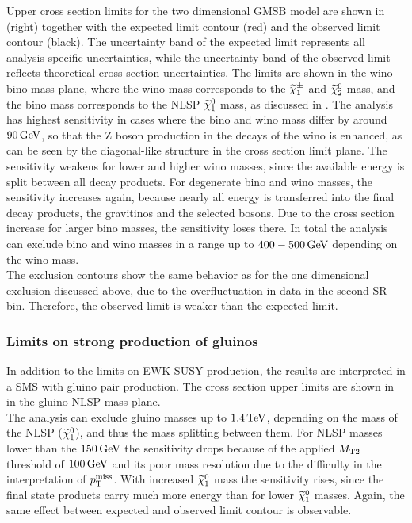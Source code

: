 Upper cross section limits for the two dimensional GMSB model are shown in  (right) together with the expected limit contour (red) and the observed limit contour (black). The uncertainty band of the expected limit represents all analysis specific uncertainties, while the uncertainty band of the observed limit reflects theoretical cross section uncertainties. The limits are shown in the wino-bino mass plane, where the wino mass corresponds to the $\widetilde{\chi}^\pm_{1}$ and $\widetilde{\chi}^{0}_{2}$ mass, and the bino mass corresponds to the NLSP $\widetilde{\chi}^{0}_{1}$ mass, as discussed in . The analysis has highest sensitivity in cases where the bino and wino mass differ by around $90\,\text{Ge\hspace{-.08em}V}$, so that the Z boson production in the decays of the wino is enhanced, as can be seen by the diagonal-like structure in the cross section limit plane. The sensitivity weakens for lower and higher wino masses, since the available energy is split between all decay products. For degenerate bino and wino masses, the sensitivity increases again, because nearly all energy is transferred into the final decay products, the gravitinos and the selected bosons. Due to the cross section increase for larger bino masses, the sensitivity loses there. In total the analysis can exclude bino and wino masses in a range up to $400-500\,\text{Ge\hspace{-.08em}V}$ depending on the wino mass.\\
The exclusion contours show the same behavior as for the one dimensional exclusion discussed above, due to the overfluctuation in data in the second SR bin. Therefore, the observed limit is weaker than the expected limit.


\subsubsection*{Limits on strong production of gluinos}
In addition to the limits on EWK SUSY production, the results are interpreted in a SMS with gluino pair production. The cross section upper limits are shown in  in the gluino-NLSP mass plane.\\
The analysis can exclude gluino masses up to $1.4\,\text{Te\hspace{-.08em}V}$, depending on the mass of the NLSP ($\widetilde{\chi}^{0}_{1}$), and thus the mass splitting between them. For NLSP masses lower than the $150\,\text{Ge\hspace{-.08em}V}$ the sensitivity drops because of the applied $M_{\mathrm{T2}}$ threshold of $100\,\text{Ge\hspace{-.08em}V}$ and its poor mass resolution due to the difficulty in the interpretation of $p_{\mathrm{T}}^\text{miss}$. With increased $\widetilde{\chi}^{0}_{1}$ mass the sensitivity rises, since the final state products carry much more energy than for lower $\widetilde{\chi}^{0}_{1}$ masses. Again, the same effect between expected and observed limit contour is observable.

